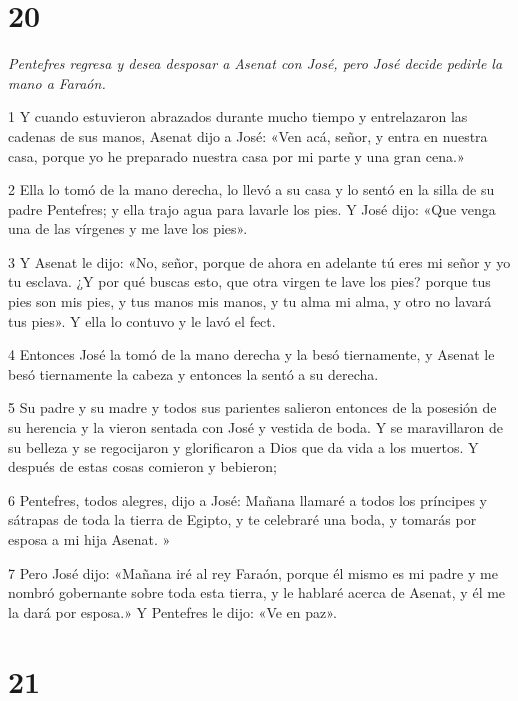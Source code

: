 \chapter{20}

\par \textit{Pentefres regresa y desea desposar a Asenat con José, pero José decide pedirle la mano a Faraón.}

\par 1 Y cuando estuvieron abrazados durante mucho tiempo y entrelazaron las cadenas de sus manos, Asenat dijo a José: «Ven acá, señor, y entra en nuestra casa, porque yo he preparado nuestra casa por mi parte y una gran cena.»

\par 2 Ella lo tomó de la mano derecha, lo llevó a su casa y lo sentó en la silla de su padre Pentefres; y ella trajo agua para lavarle los pies. Y José dijo: «Que venga una de las vírgenes y me lave los pies».

\par 3 Y Asenat le dijo: «No, señor, porque de ahora en adelante tú eres mi señor y yo tu esclava. ¿Y por qué buscas esto, que otra virgen te lave los pies? porque tus pies son mis pies, y tus manos mis manos, y tu alma mi alma, y ​​otro no lavará tus pies». Y ella lo contuvo y le lavó el fect.

\par 4 Entonces José la tomó de la mano derecha y la besó tiernamente, y Asenat le besó tiernamente la cabeza y entonces la sentó a su derecha.

\par 5 Su padre y su madre y todos sus parientes salieron entonces de la posesión de su herencia y la vieron sentada con José y vestida de boda. Y se maravillaron de su belleza y se regocijaron y glorificaron a Dios que da vida a los muertos. Y después de estas cosas comieron y bebieron;

\par 6 Pentefres, todos alegres, dijo a José: Mañana llamaré a todos los príncipes y sátrapas de toda la tierra de Egipto, y te celebraré una boda, y tomarás por esposa a mi hija Asenat. »

\par 7 Pero José dijo: «Mañana iré al rey Faraón, porque él mismo es mi padre y me nombró gobernante sobre toda esta tierra, y le hablaré acerca de Asenat, y él me la dará por esposa.» Y Pentefres le dijo: «Ve en paz».

\chapter{21}

